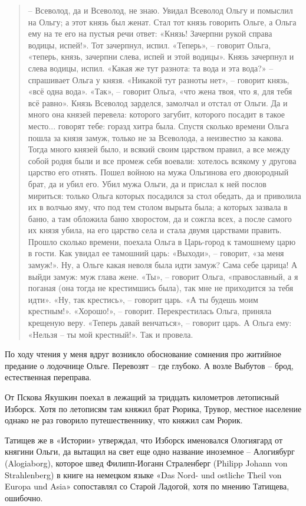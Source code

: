 \begin{quotation}
   – Всеволод, да и Всеволод, не знаю. Увидал Всеволод Ольгу и помыслил на Ольгу; а этот князь был женат. Стал тот князь говорить Ольге, а Ольга ему на те его на пустыя речи ответ: «Князь! Зачерпни рукой справа водицы, испей!». Тот зачерпнул, испил. «Теперь», – говорит Ольга, «теперь, князь, зачерпни слева, испей и этой водицы». Князь зачерпнул и слева водицы, испил. «Какая же тут разнота: та вода и эта вода?» – спрашивает Ольга у князя. «Никакой тут разноты нет», – говорит князь, «всё одна вода». «Так», – говорит Ольга, «что жена твоя, что я, для тебя всё равно». Князь Всеволод зарделся, замолчал и отстал от Ольги. Да и много она князей перевела: которого загубит, которого посадит в такое место... говорят тебе: горазд хитра была. Спустя сколько времени Ольга пошла за князя замуж, только не за Всеволода, а неизвестно за какова. Тогда много князей было, и всякий своим царством правил, а все между собой родня были и все промеж себя воевали: хотелось всякому у другова царство его отнять. Пошел войною на мужа Ольгинова его двоюродный брат, да и убил его. Убил мужа Ольги, да и прислал к ней послов мириться: только Ольга которых посадился за стол обедать, да и приволила их в волчью яму, что под тем столом вырыта была; а которых зазвала в баню, а там обложила баню хворостом, да и сожгла всех, а после самого их князя убила, на его царство села и стала двумя царствами править. Прошло сколько времени, поехала Ольга в Царь-город к тамошнему царю в гости. Как увидал ее тамошний царь: «Выходи», – говорит, «за меня замуж!». Ну, а Ольге какая неволя была идти замуж? Сама себе царица! А выйди замуж: муж глава жене. «Ты», – говорит Ольга, «православный, а я поганая (она тогда не крестимшись была), так мне не приходится за тебя идти». «Ну, так крестись», – говорит царь. «А ты будешь моим крестным!». «Хорошо!», – говорит. Перекрестилась Ольга, приняла крещеную веру. «Теперь давай венчаться», – говорит царь. А Ольга ему: «Нельзя – ты мой крестный!». Так и провела.
\end{quotation}

По ходу чтения у меня вдруг возникло обоснование сомнения про житийное предание о лодочнице Ольге. Перевозят – где глубоко. А возле Выбутов – брод, естественная переправа.

От Пскова Якушкин поехал в лежащий за тридцать километров летописный Изборск. Хотя по летописям там княжил брат Рюрика, Трувор, местное население однако не раз говорило путешественнику, что княжил сам Рюрик. 

Татищев же в «Истории» утверждал, что Изборск именовался Ологиягард от княгини Ольги, да вытащил на свет еще одно название иноземное – Алогиябург (Alogiaborg), которое швед Филипп-Иоганн Страленберг (Philipp Johann von Strahlenberg) в книге на немецком языке «Das Nord- und ostliche Theil von Europa und Asia» сопоставлял со Старой Ладогой, хотя по мнению Татищева, ошибочно.

